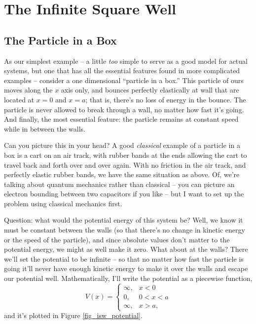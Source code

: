 \chapter{The Infinite Square Well}

\section{The Particle in a Box}

As our simplest example -- a little \emph{too} simple to serve as a good model for actual systems, but one that has all the essential features found in more complicated examples -- consider a one dimensional ``particle in a box.'' This particle of ours moves along the $x$ axis only, and bounces perfectly elastically at wall that are located at $x=0$ and $x=a$; that is, there's no loss of energy in the bounce.  The particle is never allowed to break through a wall, no matter how fast it's going.  And finally, the most essential feature: the particle remains at constant speed while in between the walls.

Can you picture this in your head?  A good \emph{classical} example of a particle in a box is a cart on an air track, with rubber bands at the ends allowing the cart to travel back and forth over and over again.  With no friction in the air track, and perfectly elastic rubber bands, we have the same situation as above.  Of, we're talking about quantum mechanics rather than classical -- you can picture an electron bounding between two capacitors if you like -- but I want to set up the problem using classical mechanics first.

Question: what would the potential energy of this system be?  Well, we know it must be constant between the walls (so that there's no change in kinetic energy or the speed of the particle), and since absolute values don't matter to the potential energy, we might as well make it zero.  What about at the walls?  There we'll set the potential to be infinite -- so that no matter how fast the particle is going it'll never have enough kinetic energy to make it over the walls and escape our potential well.  Mathematically, I'll write the potential as a piecewise function,
\begin{equation}
V(x) = 
\begin{cases} 
\infty, &  x < 0 \\
0, & 0 < x < a \\
\infty, & x>a,
\end{cases}
\end{equation}
and it's plotted in Figure \ref{fig_isw_potential}. 

